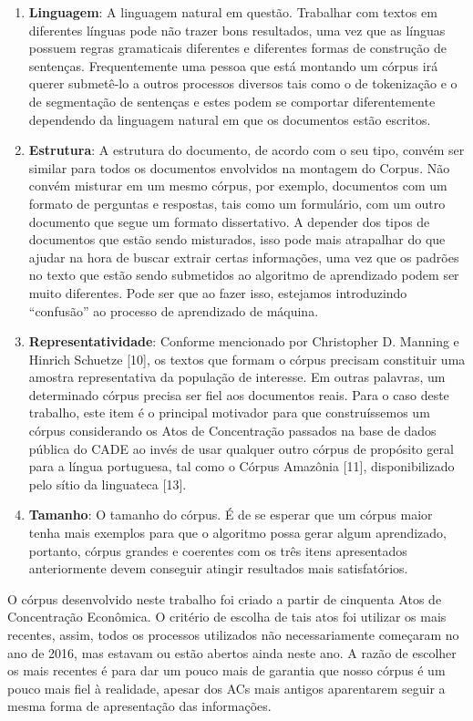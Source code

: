 \documentclass[11pt]{report}
\newcommand{\quotes}[1]{``#1''}
\begin{document}
\begin{enumerate}[label=\textbf{\arabic*.}]
  \item \textbf{Linguagem}: A linguagem natural em questão. Trabalhar com textos em diferentes línguas pode não trazer bons resultados, uma vez que as línguas possuem regras
  gramaticais diferentes e diferentes formas de construção de sentenças. Frequentemente uma pessoa que está montando um córpus irá querer submetê-lo a outros processos diversos
  tais como o de tokenização e o de segmentação de sentenças e estes podem se comportar diferentemente dependendo da linguagem natural em que os documentos estão escritos.
  \item \textbf{Estrutura}: A estrutura do documento, de acordo com o seu tipo, convém ser similar para todos os documentos envolvidos na montagem do Corpus. Não convém
  misturar em um mesmo córpus, por exemplo, documentos com um formato de perguntas e respostas, tais como um formulário, com um outro documento que segue um formato dissertativo.
  A depender dos tipos de documentos que estão sendo misturados, isso pode mais atrapalhar do que ajudar na hora de buscar extrair certas informações, uma vez que os padrões
  no texto que estão sendo submetidos ao algoritmo de aprendizado podem ser muito diferentes. Pode ser que ao fazer isso, estejamos introduzindo \quotes{confusão} ao processo
  de aprendizado de máquina.
  \item \textbf{Representatividade}: Conforme mencionado por Christopher D. Manning e Hinrich Schuetze [10], os textos que formam o córpus precisam constituir uma amostra
  representativa da população de interesse. Em outras palavras, um determinado córpus precisa ser fiel aos documentos reais. Para o caso deste trabalho, este item é o principal
  motivador para que construíssemos um córpus considerando os Atos de Concentração passados na base de dados pública do CADE ao invés de usar qualquer outro córpus de propósito
  geral para a língua portuguesa, tal como o Córpus Amazônia [11], disponibilizado pelo sítio da linguateca [13].
  \item \textbf{Tamanho}: O tamanho do córpus. É de se esperar que um córpus maior tenha mais exemplos para que o algoritmo possa gerar algum aprendizado, portanto, córpus grandes 
  e coerentes com os três itens apresentados anteriormente devem conseguir atingir resultados mais satisfatórios.
\end{enumerate}

O córpus desenvolvido neste trabalho foi criado a partir de cinquenta Atos de Concentração Econômica. O critério de escolha de tais atos foi utilizar os mais recentes, assim,
todos os processos utilizados não necessariamente começaram no ano de 2016, mas estavam ou estão abertos ainda neste ano. A razão de escolher os mais recentes é para dar um pouco
mais de garantia que nosso córpus é um pouco mais fiel à realidade, apesar dos ACs mais antigos aparentarem seguir a mesma forma de apresentação das informações.
\end{document}
